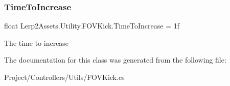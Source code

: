 \subsubsection{\texorpdfstring{Time\+To\+Increase}{TimeToIncrease}}
{\footnotesize\ttfamily float Lerp2\+Assets.\+Utility.\+F\+O\+V\+Kick.\+Time\+To\+Increase = 1f}



The time to increase 



The documentation for this class was generated from the following file\+:\begin{DoxyCompactItemize}
\item 
Project/\+Controllers/\+Utils/F\+O\+V\+Kick.\+cs\end{DoxyCompactItemize}
